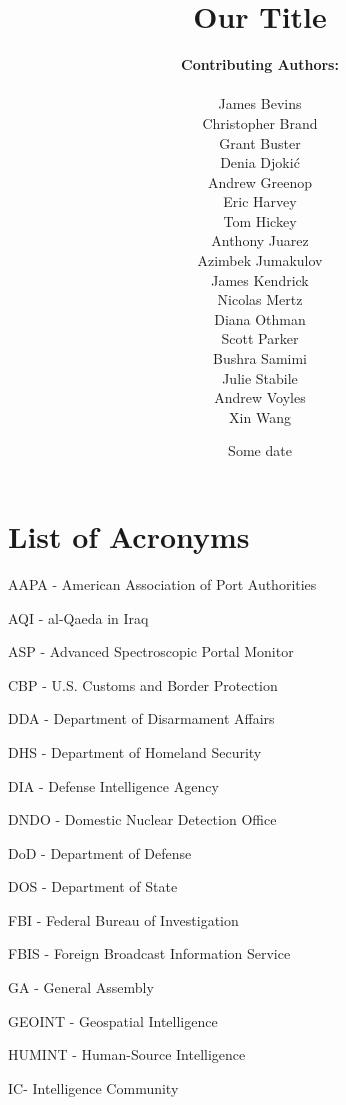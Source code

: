 \documentclass{report}
\title{Our Title}
\date{Some date}
\author{\textbf{Contributing Authors:}\\ \\
James	Bevins\\
Christopher	Brand \\
Grant	Buster\\
Denia	Djoki\'{c}\\
Andrew	Greenop\\
Eric	Harvey\\
Tom	Hickey\\
Anthony	Juarez\\
Azimbek	Jumakulov \\
James	Kendrick\\
Nicolas	Mertz \\
Diana	Othman \\
Scott	Parker \\
Bushra	Samimi \\
Julie	Stabile\\
Andrew	Voyles\\
Xin	Wang
}
\begin{document}
% 
% 
% 
% 
% 


\begin{titlepage}
\maketitle
\thispagestyle{empty}
\end{titlepage}

\pagestyle{fancyTOC}


\tableofcontents
\pagestyle{fancyTOC}




\listoffigures
\thispagestyle{fancyTOC}


\listoftables
\thispagestyle{fancyTOC}

\newpage


\pagestyle{fancyacronym}

\chapter*{List of Acronyms}
\pagestyle{fancyacronym}

AAPA - American Association of Port Authorities

AQI -  al-Qaeda in Iraq

ASP - Advanced Spectroscopic Portal Monitor

CBP - U.S. Customs and Border Protection

DDA - Department of Disarmament Affairs

DHS - Department of Homeland Security

DIA - Defense Intelligence Agency

DNDO - Domestic Nuclear Detection Office

DoD - Department of Defense

DOS - Department of State

FBI - Federal Bureau of Investigation

FBIS - Foreign Broadcast Information Service

GA - General Assembly

GEOINT - Geospatial Intelligence

HUMINT - Human-Source Intelligence

IC- Intelligence Community
\end{document}
